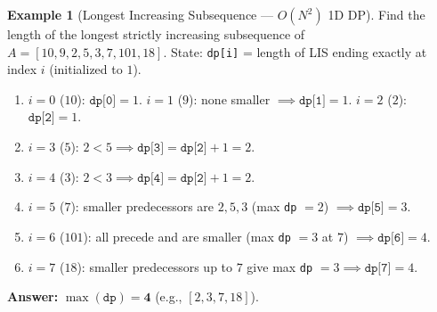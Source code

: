 \documentclass[11pt,a4paper]{article}
\theoremstyle{definition}
\newtheorem{example}{Example}[section]
\begin{document}
\begin{example}[Longest Increasing Subsequence --- $O(N^2)$ 1D DP]
Find the length of the longest strictly increasing subsequence of $A = [10, 9, 2, 5, 3, 7, 101, 18]$.
State: \texttt{dp[i]} = length of LIS ending exactly at index $i$ (initialized to $1$).
\begin{enumerate}
    \item $i = 0$ ($10$): $\texttt{dp[0]} = 1$. \quad $i = 1$ ($9$): none smaller $\implies \texttt{dp[1]} = 1$. \quad $i = 2$ ($2$): $\texttt{dp[2]} = 1$.
    \item $i = 3$ ($5$): $2 < 5 \implies \texttt{dp[3]} = \texttt{dp[2]} + 1 = 2$.
    \item $i = 4$ ($3$): $2 < 3 \implies \texttt{dp[4]} = \texttt{dp[2]} + 1 = 2$.
    \item $i = 5$ ($7$): smaller predecessors are $2, 5, 3$ (max \texttt{dp} $= 2$) $\implies \texttt{dp[5]} = 3$.
    \item $i = 6$ ($101$): all precede and are smaller (max \texttt{dp} $= 3$ at $7$) $\implies \texttt{dp[6]} = 4$.
    \item $i = 7$ ($18$): smaller predecessors up to $7$ give max \texttt{dp} $= 3 \implies \texttt{dp[7]} = 4$.
\end{enumerate}
\textbf{Answer:} $\max(\texttt{dp}) = \mathbf{4}$ (e.g., $[2, 3, 7, 18]$).
\end{example}
\end{document}
